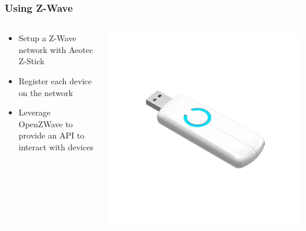 \documentclass[aspectratio=169,11pt,hyperref={colorlinks=true}]{beamer}
\begin{document}
\begin{frame}
    \frametitle{Using Z-Wave}
    \begin{columns}[T]
        \begin{column}{.48\textwidth}
            \begin{itemize}
                \item Setup a Z-Wave network with Aeotec Z-Stick
                \item Register each device on the network
                \item Leverage OpenZWave to provide an API to interact with
                    devices
            \end{itemize}
        \end{column}
        \begin{column}{.48\textwidth}
            \centering
            \includegraphics[width=.8\textwidth]{aeotec-zstick.jpg}
        \end{column}
    \end{columns}
\end{frame}
\end{document}
